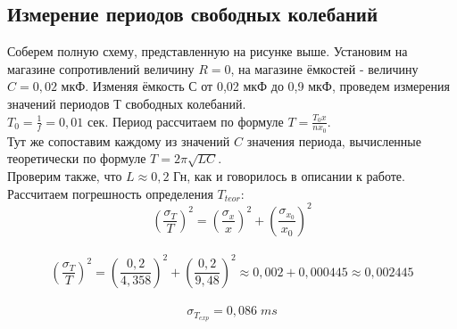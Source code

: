 \documentclass[11pt]{article}
\begin{document}
\subsection{Измерение периодов свободных колебаний}
Соберем полную схему, представленную на рисунке выше. Установим на магазине сопротивлений величину $R = 0$, на магазине ёмкостей - величину $C = 0,02$ мкФ. Изменяя ёмкость С от 0,02 мкФ до 0,9 мкФ, проведем измерения значений периодов Т свободных колебаний.\\
$T_0 = \frac{1}{f} = 0,01$ сек. Период рассчитаем по формуле $T = \frac{T_{0}x}{nx_{0}}$.\\ Тут же сопоставим каждому из значений $C$ значения периода, вычисленные теоретически по формуле $T = 2\pi\sqrt{LC}$.\\
Проверим также, что $L \approx 0,2$ Гн, как и говорилось в описании к работе.\\
Рассчитаем погрешность определения $T_{teor}$:\\
$$(\frac{\sigma_T}{T})^2 = (\frac{\sigma_x}{x})^2 + (\frac{\sigma_{x_0}}{x_0})^2$$\\
$$(\frac{\sigma_T}{T})^2 = (\frac{0,2}{4,358})^2 + (\frac{0,2}{9,48})^2 \approx 0,002 + 0,000445 \approx 0,002445$$\\
$$\sigma_{T_{exp}} = 0,086 \; ms$$\\
\end{document}
